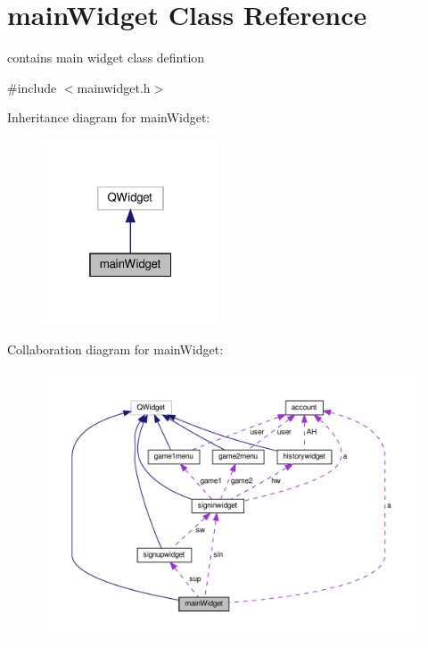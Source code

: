 \hypertarget{classmainWidget}{}\section{main\+Widget Class Reference}
\label{classmainWidget}


contains main widget class defintion  




{\ttfamily \#include $<$mainwidget.\+h$>$}



Inheritance diagram for main\+Widget\+:\nopagebreak
\begin{figure}[H]
\begin{center}
\leavevmode
\includegraphics[width=148pt]{classmainWidget__inherit__graph}
\end{center}
\end{figure}


Collaboration diagram for main\+Widget\+:
\nopagebreak
\begin{figure}[H]
\begin{center}
\leavevmode
\includegraphics[width=350pt]{classmainWidget__coll__graph}
\end{center}
\end{figure}
